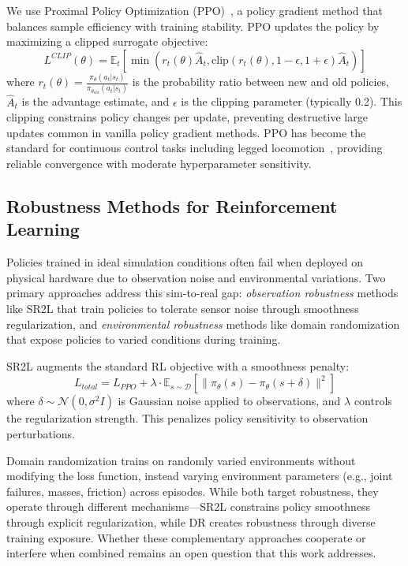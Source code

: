 \documentclass[conference]{IEEEtran}
\begin{document}
We use Proximal Policy Optimization (PPO)~\cite{schulman2017proximal}, a policy gradient method that balances sample efficiency with training stability. PPO updates the policy by maximizing a clipped surrogate objective:
\begin{equation}
L^{CLIP}(\theta) = \mathbb{E}_t\left[\min\left(r_t(\theta)\hat{A}_t, \text{clip}(r_t(\theta), 1-\epsilon, 1+\epsilon)\hat{A}_t\right)\right]
\end{equation}
where $r_t(\theta) = \frac{\pi_\theta(a_t|s_t)}{\pi_{\theta_{old}}(a_t|s_t)}$ is the probability ratio between new and old policies, $\hat{A}_t$ is the advantage estimate, and $\epsilon$ is the clipping parameter (typically 0.2). This clipping constrains policy changes per update, preventing destructive large updates common in vanilla policy gradient methods. PPO has become the standard for continuous control tasks including legged locomotion~\cite{hwangbo2019learning,lee2020learning}, providing reliable convergence with moderate hyperparameter sensitivity.

\subsection{Robustness Methods for Reinforcement Learning}

Policies trained in ideal simulation conditions often fail when deployed on physical hardware due to observation noise and environmental variations. Two primary approaches address this sim-to-real gap: \textit{observation robustness} methods like SR2L that train policies to tolerate sensor noise through smoothness regularization, and \textit{environmental robustness} methods like domain randomization that expose policies to varied conditions during training.

SR2L augments the standard RL objective with a smoothness penalty:
\begin{equation}
L_{total} = L_{PPO} + \lambda \cdot \mathbb{E}_{s \sim \mathcal{D}} [\|\pi_\theta(s) - \pi_\theta(s + \delta)\|^2]
\end{equation}
where $\delta \sim \mathcal{N}(0, \sigma^2 I)$ is Gaussian noise applied to observations, and $\lambda$ controls the regularization strength. This penalizes policy sensitivity to observation perturbations.

Domain randomization trains on randomly varied environments without modifying the loss function, instead varying environment parameters (e.g., joint failures, masses, friction) across episodes. While both target robustness, they operate through different mechanisms—SR2L constrains policy smoothness through explicit regularization, while DR creates robustness through diverse training exposure. Whether these complementary approaches cooperate or interfere when combined remains an open question that this work addresses.
\end{document}
